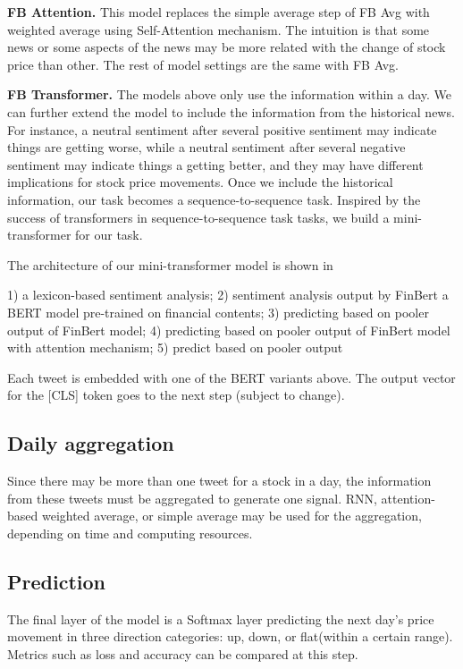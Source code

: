 \documentclass[11pt]{article}
\begin{document}
\textbf{FB Attention.} This model replaces the simple average step of FB Avg with weighted average using Self-Attention mechanism. The intuition is that some news or some aspects of the news may be more related with the change of stock price than other. The rest of model settings are the same with FB Avg.

\textbf{FB Transformer.} The models above only use the information within a day. We can further extend the model to include the information from the historical news. For instance, a neutral sentiment after several positive sentiment may indicate things are getting worse, while a neutral sentiment after several negative sentiment may indicate things a getting better, and they may have different implications for stock price movements. Once we include the historical information, our task becomes a sequence-to-sequence task. Inspired by the success of transformers in sequence-to-sequence task tasks, we build a mini-transformer for our task.

The architecture of our mini-transformer model is shown in 









1) a lexicon-based sentiment analysis; 2) sentiment analysis output by FinBert a BERT model pre-trained on financial contents; 3) predicting based on pooler output of FinBert model; 4) predicting based on pooler output of FinBert model with attention mechanism; 5) predict based on pooler output 

Each tweet is embedded with one of the BERT variants above. The output vector for the [CLS] token goes to the next step (subject to change).

\subsection{Daily aggregation}
Since there may be more than one tweet for a stock in a day, the information from these tweets must be aggregated to generate one signal. RNN, attention-based weighted average, or simple average may be used for the aggregation, depending on time and computing resources. 

\subsection{Prediction}
The final layer of the model is a Softmax layer predicting the next day's price movement in three direction categories: up, down, or flat(within a certain range). Metrics such as loss and accuracy can be compared at this step.
\end{document}
